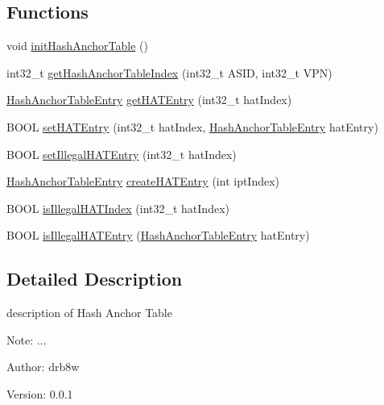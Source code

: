 \subsection*{Functions}
\begin{CompactItemize}
\item 
void \hyperlink{group___v_m_m___h_a_t_ge31a05f91c4fb2cb19f80de59672a3fc}{initHashAnchorTable} ()
\item 
int32\_\-t \hyperlink{group___v_m_m___h_a_t_g25766528701c0fd3f34edbe61803e398}{getHashAnchorTableIndex} (int32\_\-t ASID, int32\_\-t VPN)
\item 
\hyperlink{group___v_m_m___h_a_t_g06b98a0b294446afee1b27a04682d7c2}{HashAnchorTableEntry} \hyperlink{group___v_m_m___h_a_t_g6d77bf5eb6d8b03e762b5b5c4f82a3d9}{getHATEntry} (int32\_\-t hatIndex)
\item 
BOOL \hyperlink{group___v_m_m___h_a_t_g04b252b48624d628fb9679afac037553}{setHATEntry} (int32\_\-t hatIndex, \hyperlink{group___v_m_m___h_a_t_g06b98a0b294446afee1b27a04682d7c2}{HashAnchorTableEntry} hatEntry)
\item 
BOOL \hyperlink{group___v_m_m___h_a_t_g65d55af720a6e86ea7018e5455047269}{setIllegalHATEntry} (int32\_\-t hatIndex)
\item 
\hyperlink{group___v_m_m___h_a_t_g06b98a0b294446afee1b27a04682d7c2}{HashAnchorTableEntry} \hyperlink{group___v_m_m___h_a_t_g675250e60a6a6b29b540d8a029db25bf}{createHATEntry} (int iptIndex)
\item 
BOOL \hyperlink{group___v_m_m___h_a_t_g310fed144216406f0affe436c1231342}{isIllegalHATIndex} (int32\_\-t hatIndex)
\item 
BOOL \hyperlink{group___v_m_m___h_a_t_g103d7fcf856a6ff6afb186439d1c308e}{isIllegalHATEntry} (\hyperlink{group___v_m_m___h_a_t_g06b98a0b294446afee1b27a04682d7c2}{HashAnchorTableEntry} hatEntry)
\end{CompactItemize}


\subsection{Detailed Description}
description of Hash Anchor Table 

\begin{Desc}
\item[Note:]... \end{Desc}
\begin{Desc}
\item[Author:]drb8w \end{Desc}
\begin{Desc}
\item[Version:]0.0.1 \end{Desc}


